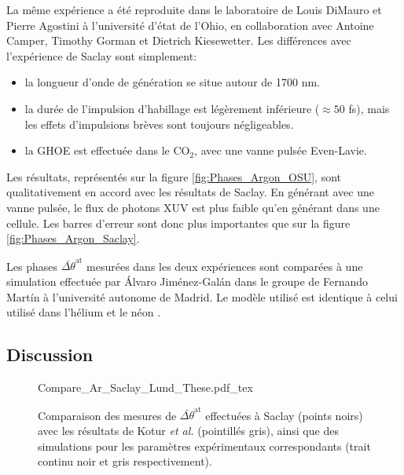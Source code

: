 La même expérience a été reproduite dans le laboratoire de Louis DiMauro et Pierre Agostini à l'université d'état de l'Ohio, en collaboration avec Antoine Camper, Timothy Gorman et Dietrich Kiesewetter. Les différences avec l'expérience de Saclay sont simplement:
\begin{itemize}
\item la longueur d'onde de génération se situe autour de 1700 nm.
\item la durée de l'impulsion d'habillage est légèrement inférieure ($\approx 50$ fs), mais les effets d'impulsions brèves sont toujours négligeables.
\item la GHOE est effectuée dans le CO$_2$, avec une vanne pulsée Even-Lavie.
\end{itemize}
Les résultats, représentés sur la figure \ref{fig:Phases_Argon_OSU}, sont qualitativement en accord avec les résultats de Saclay. En générant avec une vanne pulsée, le flux de photons XUV est plus faible qu'en générant dans une cellule. Les barres d'erreur sont donc plus importantes que sur la figure \ref{fig:Phases_Argon_Saclay}.

Les phases $\bar{\Delta \theta}^{\text{at}}$ mesurées dans les deux expériences sont comparées à une simulation effectuée par \'{A}lvaro Jiménez-Gal\'{a}n dans le groupe de Fernando Mart\'{i}n à l'université autonome de Madrid. Le modèle utilisé est identique à celui utilisé dans l'hélium et le néon .

\subsection{Discussion}
\begin{figure}[ht]
\centering
\def\svgwidth{1\textwidth}
{Compare_Ar_Saclay_Lund_These.pdf_tex}
\caption{Comparaison des mesures de $\bar{\Delta \theta}^{\text{at}}$ effectuées à Saclay (points noirs) avec les résultats de Kotur \textit{et al.} (pointillés gris), ainsi que des simulations pour les paramètres expérimentaux correspondants (trait continu noir et gris respectivement).}
\label{fig:Compare_Ar_Saclay_Lund_These}
\end{figure}

